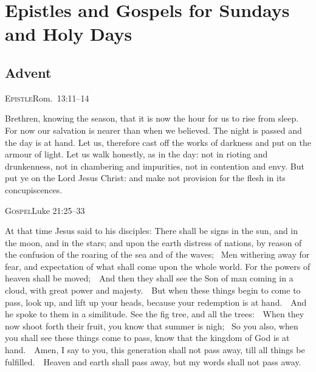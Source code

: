 ﻿\def\tabmark{Readings}

\newcommand\bibleref[2]{\parbox{\columnwidth}{{\large\scshape{#1}}\hfill{\footnotesize #2}}\nobreak}
\newcommand\challnote[1]{}


\chapter{Epistles and Gospels for Sundays and Holy Days}


\begin{multicols}{2}

\small

\section{Advent}


\bibleref{Epistle}{Rom.~13:11--14}

Brethren, knowing the season, that it is now the hour for us to
rise from sleep. For now our salvation is nearer than when we believed.
The night is passed and the day is at hand. Let us, therefore
cast off the works of darkness and put on the armour of light.
Let us walk honestly, as in the day: not in rioting and
drunkenness, not in chambering and impurities, not in contention and
envy.
But put ye on the Lord Jesus Christ: and make not provision for
the flesh in its concupiscences.


\bibleref{Gospel}{Luke 21:25--33}

At that time Jesus said to his disciples: There shall be signs in the sun, and in the moon, and in the stars; and
upon the earth distress of nations, by reason of the confusion of the roaring
of the sea and of the waves;  Men withering away for fear, and expectation of
what shall come upon the whole world. For the powers of heaven shall be
moved;  And then they shall see the Son of man coming in a cloud, with great
power and majesty.  But when these things begin to come to pass, look up, and
lift up your heads, because your redemption is at hand.  And he spoke to them
in a similitude. See the fig tree, and all the trees:  When they now shoot
forth their fruit, you know that summer is nigh;  So you also, when you shall
see these things come to pass, know that the kingdom of God is at hand.  Amen,
I say to you, this generation shall not pass away, till all things be
fulfilled.  Heaven and earth shall pass away, but my words shall not pass away.



\end{multicols}
